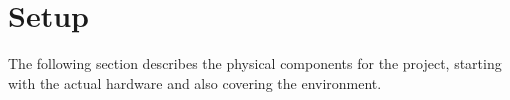 \section{Setup}
\label{sec:setup}

The following section describes the physical components for the project, starting with the actual hardware and also covering the environment.